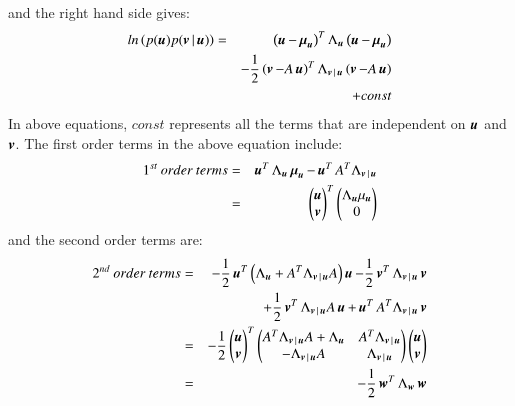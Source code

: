and the right hand side gives:
\begin{eqnarray}
	ln \left(p(\mybold{u}) p(\mybold{v}|\mybold{u}) \right) =&& \left(\mybold{u}-\mybold{\mu}_{\mybold{u}} \right)^T \Lambda_{\mybold{u}} \left(\mybold{u}-\mybold{\mu}_{\mybold{u}} \right) \nonumber\\
	&&- \frac{1}{2} \left( \mybold{v}-A\mybold{u} \right)^T \Lambda_{\mybold{v}|\mybold{u}} \left( \mybold{v}-A\mybold{u} \right) \nonumber\\
	&&+ const
\label{eq:LG8}
\end{eqnarray}
In above equations, $ const $ represents all the terms that are independent on $ \operatorname{\boldsymbol{u}} $ and $\operatorname{\boldsymbol{v}}$. The first order terms in the above equation include:
\begin{eqnarray}
	1^{st} \: order \: terms =&& \mybold{u}^T  \Lambda_{\mybold{u}} \mybold{\mu}_{\mybold{u}} - \mybold{u}^T A^T\Lambda_{\mybold{v}|\mybold{u}} \nonumber\\
	=&&  \left(\begin{matrix}\mybold{u}\\\mybold{v} \end{matrix}\right)^T  \left(\begin{matrix}\Lambda_{\mybold{u}}{\mu}_{\mybold{u}} \\ 0 \end{matrix}\right)
\label{eq:LG9}
\end{eqnarray}
and the second order terms are:
\begin{eqnarray}
	2^{nd} \: order \: terms = && -\frac{1}{2} \mybold{u}^T \left( \Lambda_{\mybold{u}}+A^T \Lambda_{\mybold{v}|\mybold{u}} A \right)\mybold{u}  - \frac{1}{2} \mybold{v}^T \Lambda_{\mybold{v}|\mybold{u}} \mybold{v} \nonumber\\
	&& + \frac{1}{2} \mybold{v}^T \Lambda_{\mybold{v}|\mybold{u}} A \mybold{u} + \mybold{u}^T A^T \Lambda_{\mybold{v}|\mybold{u}} \mybold{v} \nonumber\\
	=&& -\frac{1}{2} \left(\begin{matrix}\mybold{u}\\\mybold{v} \end{matrix}\right)^T  \left(\begin{matrix}A^T\Lambda_{\mybold{v}|\mybold{u}}A+\Lambda_{\mybold{u}} & A^T\Lambda_{\mybold{v}|\mybold{u}} \nonumber\\ -\Lambda_{\mybold{v}|\mybold{u}} A & \Lambda_{\mybold{v}|\mybold{u}}\end{matrix}\right) \left(\begin{matrix}\mybold{u}\\\mybold{v} \end{matrix}\right) \\
	=&& -\frac{1}{2} \mybold{w}^T \Lambda_{\mybold{w}} \mybold{w}
\label{eq:LG10}
\end{eqnarray}
